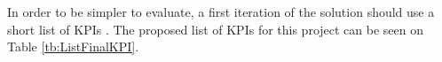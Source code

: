 



In order to be simpler to evaluate, a first iteration of the solution should use a short list of KPIs \cite{Costa2004}. The proposed list of KPIs for this project can be seen on Table \ref{tb:ListFinalKPI}.

